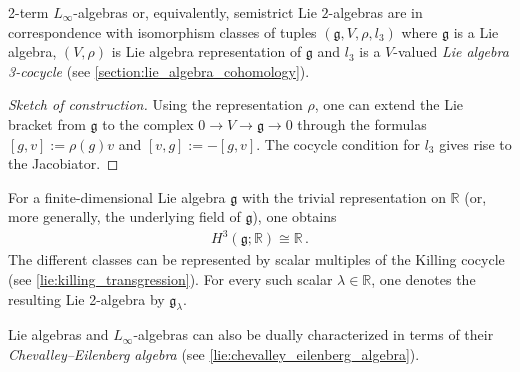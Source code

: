     \begin{property}
        2-term $L_\infty$-algebras or, equivalently, semistrict Lie $2$-algebras are in correspondence with isomorphism classes of tuples $(\mathfrak{g},V,\rho,l_3)$ where $\mathfrak{g}$ is a Lie algebra, $(V,\rho)$ is Lie algebra representation of $\mathfrak{g}$ and $l_3$ is a $V$-valued \textit{Lie algebra 3-cocycle} (see \cref{section:lie_algebra_cohomology}).
        \begin{mdframed}[roundcorner=10pt, linecolor=blue, linewidth=1pt]
            \begin{proof}[Sketch of construction]
                Using the representation $\rho$, one can extend the Lie bracket from $\mathfrak{g}$ to the complex $0\rightarrow V\rightarrow\mathfrak{g}\rightarrow0$ through the formulas $[g,v]:=\rho(g)v$ and $[v,g] := -[g,v]$. The cocycle condition for $l_3$ gives rise to the Jacobiator.
            \end{proof}
        \end{mdframed}
    \end{property}
    \begin{example}\label{hda:gk_lie_2_algebra}
        For a finite-dimensional Lie algebra $\mathfrak{g}$ with the trivial representation on $\mathbb{R}$ (or, more generally, the underlying field of $\mathfrak{g}$), one obtains
        \begin{gather}
            H^3(\mathfrak{g};\mathbb{R})\cong\mathbb{R}\,.
        \end{gather}
        The different classes can be represented by scalar multiples of the Killing cocycle (see \cref{lie:killing_transgression}). For every such scalar $\lambda\in\mathbb{R}$, one denotes the resulting Lie 2-algebra by $\mathfrak{g}_\lambda$.
    \end{example}

    Lie algebras and $L_\infty$-algebras can also be dually characterized in terms of their \textit{Chevalley--Eilenberg algebra} (see \cref{lie:chevalley_eilenberg_algebra}).

